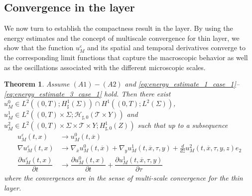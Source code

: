 \documentclass[11pt]{article}
\newtheorem{theorem}{Theorem}
\def\es{\varepsilon}
\def\T{\mathcal{T}}
\begin{document}
\subsection{Convergence in the layer}

We now turn to establish the compactness result in the layer. By using the energy estimates and the concept of multiscale convergence for thin layer, we show that the function $u_M^\es$ and its spatial and temporal derivatives converge to  the corresponding limit functions that capture the macroscopic behavior as well as the oscillations associated with the different microscopic scales.
   \begin{theorem}\label{theorem:convergence_in_the_layer}
    Assume $(A1)-(A2)$ and \eqref{eq:energy_estimate_1_case_1}--\eqref{eq:energy_estimate_3_case_1} hold. Then there exist \\ $u_M^0\in L^2((0,T);H^1_{\sharp}(\Sigma))\cap H^1((0,T);L^2(\Sigma))$, $u_M^1\in L^2((0,T)\times \Sigma;\mathcal{H}_{\sharp,0}(\T\times Y))$ and $u_M^2\in L^2((0,T)\times \Sigma \times \T\times Y;H^1_{\sharp,0}(Z) )$ such that up to a subsequence
    \begin{subequations}
    \begin{align}
        u_M^\es(t,x)&\longrightarrow u_M^0(t,\overline{x})\label{eq:multiscale_convergence_for_u}\\
        \nabla u_M^\es(t,x)&\longrightarrow \nabla_{\overline{x}}u_M^0(t,\overline{x})+\nabla_y u_M^1(t,\overline{x},\tau,y)+\frac{d}{dz}u_M^2(t,\overline{x},\tau,y,z)e_2\label{eq:multiscale_convergence_for_gradient_term} \\
        \dfrac{\partial u_M^\es(t,x)}{\partial t}&\longrightarrow  \dfrac{\partial u_M^0(t,x)}{\partial t}+ \dfrac{\partial u_M^1(t,\overline{x},\tau,y)}{\partial \tau}\label{eq:multiscale_convergence_for_time_derivative_term}
    \end{align}
    \end{subequations}
    where the convergences are in the sense of multi-scale convergence for the thin layer.
    \end{theorem}
\end{document}
